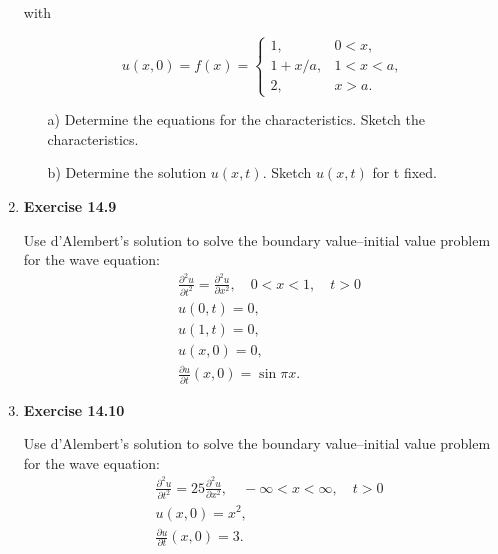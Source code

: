 \begin{enumerate}
with

\[
u(x,0)=f(x)=
\begin{cases}
    1 , & 0<x, \\
    1+x/a, & 1<x<a, \\
    2, & x>a.
\end{cases}
\]

\begin{enumerate}
    \item[a)] Determine the equations for the characteristics. Sketch the characteristics.
    \item[b)] Determine the solution $u(x, t)$. Sketch $u(x, t)$ for t fixed.
\end{enumerate}


\newpage

\item \textbf{Exercise 14.9}

Use d'Alembert's solution to solve the boundary value--initial value problem for the wave equation:
\[
\begin{aligned}
    & \frac{\partial ^{2}u}{\partial t^{2}} =  \frac{\partial^{2}u}{\partial x^{2}}, \quad 0<x<1, \quad t>0 \\
    & u(0,t)=0, \\
    & u(1,t)=0, \\
    & u(x,0)=0, \\
    & \frac{\partial u}{\partial t}(x,0) = \sin \pi x.
\end{aligned}
\]


\newpage

\item \textbf{Exercise 14.10}

Use d'Alembert's solution to solve the boundary value--initial value problem for the wave equation:
\[
\begin{aligned}
    & \frac{\partial ^{2}u}{\partial t^{2}} =  25 \frac{\partial^{2}u}{\partial x^{2}}, \quad -\infty<x<\infty, \quad t>0 \\
    & u(x,0)=x^{2}, \\
    & \frac{\partial u}{\partial t}(x,0) = 3.
\end{aligned}
\]



\end{enumerate}

\newpage


